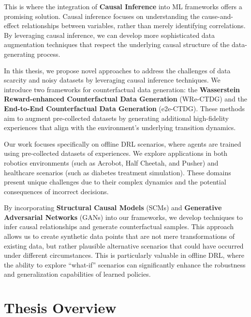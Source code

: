 This is where the integration of \textbf{Causal Inference} into
ML frameworks offers a
promising solution. Causal inference focuses on understanding the
cause-and-effect relationships between variables, rather
than merely identifying correlations. By leveraging causal inference,
we can develop more sophisticated data augmentation techniques that
respect the underlying causal structure of the data-generating process.

In this thesis, we propose novel approaches to address the
challenges of data scarcity and noisy datasets by leveraging
causal inference techniques. We introduce two frameworks for
counterfactual data generation:
the \textbf{Wasserstein Reward-enhanced Counterfactual Data Generation}
(WRe-CTDG) and the \textbf{End-to-End Counterfactual Data Generation} (e2e-CTDG).
These methods aim to augment pre-collected datasets by generating additional
high-fidelity experiences that align with the environment's underlying
transition dynamics.

Our work focuses specifically on offline DRL scenarios, where agents
are trained using pre-collected datasets of experiences.
We explore applications in both robotics environments
(such as Acrobot, Half Cheetah, and Pusher) and healthcare scenarios
(such as diabetes treatment simulation).
These domains present unique challenges due to their complex
dynamics and the potential consequences of incorrect decisions.

By incorporating \textbf{Structural Causal Models} (SCMs) and
\textbf{Generative Adversarial Networks} (GANs) into our frameworks,
we develop techniques to infer causal relationships and generate counterfactual
samples. This approach allows us to create synthetic data points
that are not mere transformations of existing data, but rather plausible
alternative scenarios that could have occurred under different circumstances.
This is particularly valuable in offline DRL, where the ability to explore
``what-if'' scenarios can significantly enhance the robustness
and generalization capabilities of learned policies.

\section{Thesis Overview}

